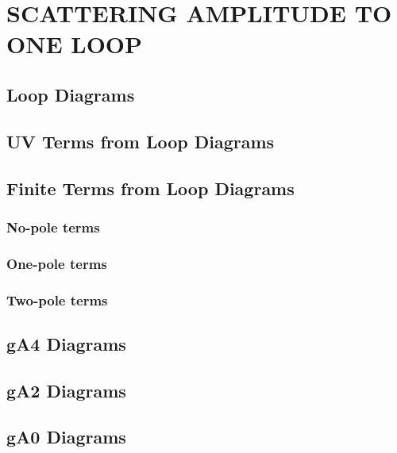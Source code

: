 \chapter{SCATTERING AMPLITUDE TO ONE LOOP}

\section{Loop Diagrams}
\section{UV Terms from Loop Diagrams}
\section{Finite Terms from Loop Diagrams}
\subsection{No-pole terms}
\subsection{One-pole terms}
\subsection{Two-pole terms}

\section{gA4 Diagrams}
\section{gA2 Diagrams}
\section{gA0 Diagrams}




\newpage
